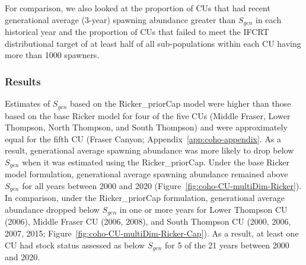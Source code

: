 \documentclass[11pt]{book}
\begin{document}
For comparison, we also looked at the proportion of CUs that had recent generational average (3-year) spawning abundance greater than \(S_{gen}\) in each historical year and the proportion of CUs that failed to meet the IFCRT distributional target of at least half of all sub-populations within each CU having more than 1000 spawners.

\hypertarget{results}{%
\subsubsection{Results}\label{results}}

Estimates of \(S_{gen}\) based on the Ricker\_priorCap model were higher than those based on the base Ricker model for four of the five CUs (Middle Fraser, Lower Thompson, North Thompson, and South Thompson) and were approximately equal for the fifth CU (Fraser Canyon; Appendix~\ref{app:coho-appendix}. As a result, generational average spawning abundance was more likely to drop below \(S_{gen}\) when it was estimated using the Ricker\_priorCap. Under the base Ricker model formulation, generational average spawning abundance remained above \(S_{gen}\) for all years between 2000 and 2020 (Figure~\ref{fig:coho-CU-multiDim-Ricker}). In comparison, under the Ricker\_priorCap formulation, generational average abundance dropped below \(S_{gen}\) in one or more years for Lower Thompson CU (2006), Middle Fraser CU (2006, 2008), and South Thompson CU (2000, 2006, 2007, 2015; Figure~\ref{fig:coho-CU-multiDim-Ricker-Cap}). As a result, at least one CU had stock status assessed as below \(S_{gen}\) for 5 of the 21 years between 2000 and 2020.
\end{document}
